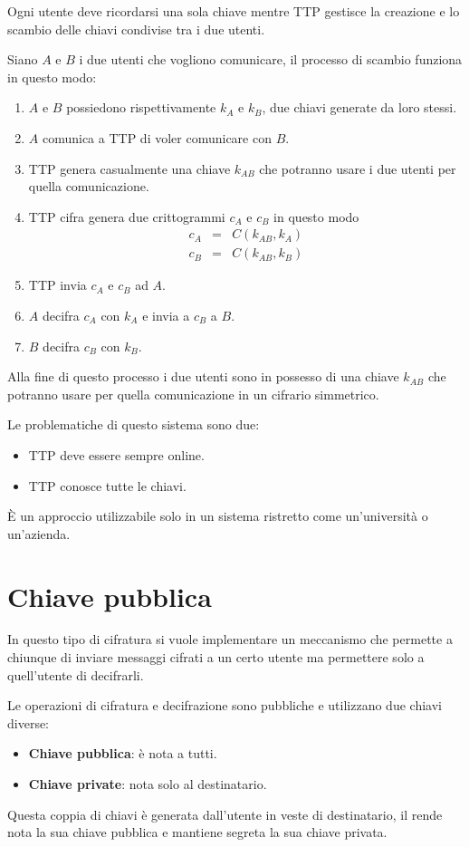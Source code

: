 Ogni utente deve ricordarsi una sola chiave mentre TTP gestisce la creazione e lo scambio delle chiavi condivise tra i
due utenti.

Siano $A$ e $B$ i due utenti che vogliono comunicare, il processo di scambio funziona in questo modo:
\begin{enumerate}
	\item $A$ e $B$ possiedono rispettivamente $k_A$ e $k_B$, due chiavi generate da loro stessi.
	\item $A$ comunica a TTP di voler comunicare con $B$.
	\item TTP genera casualmente una chiave $k_{AB}$ che potranno usare i due utenti per quella comunicazione.
	\item TTP cifra genera due crittogrammi $c_A$ e $c_B$ in questo modo
	      \[
		      \begin{matrix}
			      c_A & = & C(k_{AB}, k_A) \\
			      c_B & = & C(k_{AB}, k_B)
		      \end{matrix}
	      \]
	\item TTP invia $c_A$ e $c_B$ ad $A$.
	\item $A$ decifra $c_A$ con $k_A$ e invia a $c_B$ a $B$.
	\item $B$ decifra $c_B$ con $k_B$.
\end{enumerate}
Alla fine di questo processo i due utenti sono in possesso di una chiave $k_{AB}$ che potranno usare per quella
comunicazione in un cifrario simmetrico.

Le problematiche di questo sistema sono due:
\begin{itemize}
	\item TTP deve essere sempre online.
	\item TTP conosce tutte le chiavi.
\end{itemize}
\`E un approccio utilizzabile solo in un sistema ristretto come un'universit\`a o un'azienda.

\section{Chiave pubblica}
In questo tipo di cifratura si vuole implementare un meccanismo che permette a chiunque di inviare messaggi cifrati a un
certo utente ma permettere solo a quell'utente di decifrarli.

Le operazioni di cifratura e decifrazione sono pubbliche e utilizzano due chiavi diverse:
\begin{itemize}
	\item \textbf{Chiave pubblica}: \`e nota a tutti.
	\item \textbf{Chiave private}: nota solo al destinatario.
\end{itemize}
Questa coppia di chiavi \`e generata dall'utente in veste di destinatario, il rende nota la sua chiave pubblica e mantiene
segreta la sua chiave privata.

